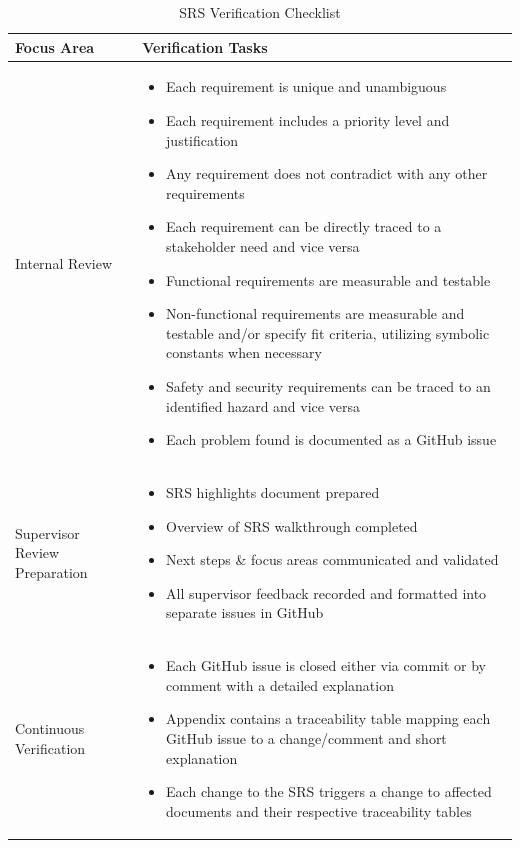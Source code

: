 \documentclass[12pt, titlepage]{article}
\begin{document}
\begin{table}[H]
\centering
\caption{SRS Verification Checklist}
\label{tab:srs}
\renewcommand{\arraystretch}{1.3}
\setlength{\tabcolsep}{8pt}
\begin{tabular}{|p{}|p{}|}
\hline
\textbf{Focus Area} & \textbf{Verification Tasks} \\ \hline
Internal Review &
\begin{itemize}
  \item Each requirement is unique and unambiguous
  \item Each requirement includes a priority level and justification
  \item Any requirement does not contradict with any other requirements
  \item Each requirement can be directly traced to a stakeholder need and vice versa
  \item Functional requirements are measurable and testable
  \item Non-functional requirements are measurable and testable and/or specify fit criteria, utilizing symbolic constants when necessary
  \item Safety and security requirements can be traced to an identified hazard and vice versa
  \item Each problem found is documented as a GitHub issue
\end{itemize} \\ \hline
Supervisor Review Preparation &
\begin{itemize}
  \item SRS highlights document prepared
  \item Overview of SRS walkthrough completed
  \item Next steps \& focus areas communicated and validated
  \item All supervisor feedback recorded and formatted into separate issues in GitHub
\end{itemize} \\ \hline
Continuous Verification &
\begin{itemize}
  \item Each GitHub issue is closed either via commit or by comment with a detailed explanation
  \item Appendix contains a traceability table mapping each GitHub issue to a change/comment and short explanation
  \item Each change to the SRS triggers a change to affected documents and their respective traceability tables
\end{itemize} \\ \hline
\end{tabular}
\end{table}
\end{document}
